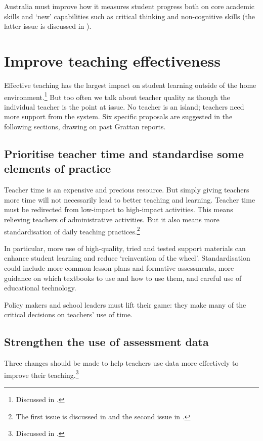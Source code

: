 Australia must improve how it measures student progress both on core academic skills and `new' capabilities such as critical thinking and non-cognitive skills (the latter issue is discussed in ). 

\section{Improve teaching effectiveness}\label{sec:Improve-teaching-effectiveness}

Effective teaching has the largest impact on student learning outside of the home environment.\footnote{Discussed in \textcite{Jensen2010Investinginourteachers}.} But too often we talk about teacher quality as though the individual teacher is the point at issue. No teacher is an island; teachers need more support from the system. Six specific proposals are suggested in the following sections, drawing on past Grattan reports. 

\subsection{Prioritise teacher time and standardise some elements of practice}\label{subsec:prioritise} 

Teacher time is an expensive and precious resource. But simply giving teachers more time will not necessarily lead to better teaching and learning. Teacher time must be redirected from low-impact to high-impact activities. This means relieving teachers of administrative activities. But it also means more standardisation of daily teaching practices.\footnote{The first issue is discussed in \textcite{Jensen2012Makingtimeforgreatteaching} and the second issue in \textcite{Goss2015TargetedTeachingHow}.} 

In particular, more use of high-quality, tried and tested support materials can enhance student learning and reduce `reinvention of the wheel'. Standardisation could include more common lesson plans and formative assessments, more guidance on which textbooks to use and how to use them, and careful use of educational technology. 

Policy makers and school leaders must lift their game: they make many of the critical decisions on teachers' use of time.  

\subsection{Strengthen the use of assessment data}\label{subsec:strengthen_the_use_assessment}
Three changes should be made to help teachers use data more effectively to improve their teaching.\footnote{Discussed in \textcite{Goss2015TargetedTeachingHow}.}

